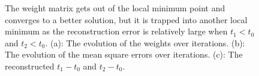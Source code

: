 \begin{figure}
\centering
{}
\caption{The weight matrix gets out of the local minimum point and converges to a better solution,
but it is trapped into another local minimum as
the reconstruction error is relatively large when $t_1 < t_0$ and $t_2 < t_0$.
(a): The evolution of the weights over iterations.
(b): The evolution of the mean square errors over iterations.
(c): The reconstructed $t_1-t_0$ and $t_2-t_0$.}
\label{local_better}
\end{figure}

